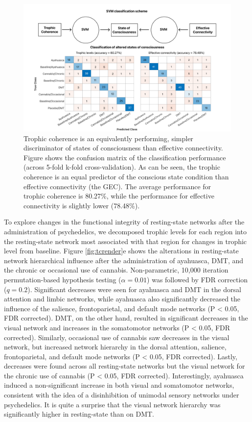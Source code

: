 \begin{figure}[h!]
    \centering
    \includegraphics[width=\textwidth]{images/Figure 5 SVM.png}
    \caption[Trophic coherence
is an equivalently performing, simpler discriminator of states of consciousness than
effective connectivity.]{Trophic coherence
is an equivalently performing, simpler discriminator of states of consciousness than
effective connectivity. Figure shows the confusion matrix of the
classification performance (across 5-fold k-fold cross-validation). As
can be seen, the trophic coherence is an equal predictor
of the conscious state condition than effective connectivity (the GEC).
The average performance for trophic coherence is 80.27\%, while the
performance for effective connectivity is slightly lower
(78.48\%).}
    \label{fig:svm}
\end{figure}

To explore changes in the functional integrity of resting-state networks after the administration of psychedelics, we decomposed trophic levels for each region into the resting-state network most associated with that region for changes in trophic level from baseline. Figure \ref{fig:tcrender}e shows the alterations in resting-state network hierarchical influence after the administration of ayahuasca, DMT, and the chronic or occasional use of cannabis. Non-parametric, 10,000 iteration permutation-based hypothesis testing ($\alpha = 0.01$) was followed by FDR correction ($q=0.2$). Significant decreases were seen for ayahuasca and DMT in the dorsal attention and limbic networks, while ayahuasca also significantly decreased the influence of the salience, frontoparietal, and default mode networks (P < 0.05, FDR corrected). DMT, on the other hand, resulted in significant decreases in the visual network and increases in the somatomotor networks (P < 0.05, FDR corrected). Similarly, occasional use of cannabis saw decreases in the visual network, but increased network hierarchy in the dorsal attention, salience, frontoparietal, and default mode networks (P < 0.05, FDR corrected). Lastly, decreases were found across all resting-state networks but the visual network for the chronic use of cannabis (P < 0.05, FDR corrected). Interestingly, ayahuasca induced a non-significant increase in both visual and somatomotor networks, consistent with the idea of a disinhibition of unimodal sensory networks under psychedelics. It is quite a surprise that the visual network hierarchy was significantly higher in resting-state than on DMT.

